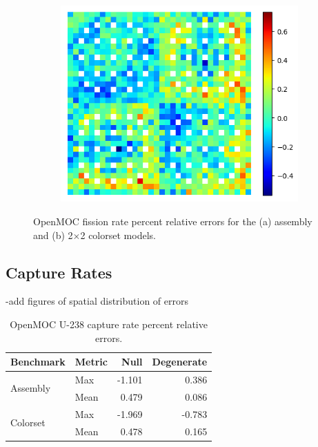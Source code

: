 \begin{figure}[h!]
\begin{subfigure}{0.45\textwidth}
  \includegraphics[width=\linewidth]{figures/reflector/fiss-degenerate-errors}
  \caption{}
  \label{fig:reflector-fiss-degen-error}
\end{subfigure}
\caption{OpenMOC fission rate percent relative errors for the (a) assembly and (b) 2$\times$2 colorset models.}
\label{fig:fiss-errors}
\end{figure}


\subsection{Capture Rates}
\label{subsec:capt-rates}

-add figures of spatial distribution of errors

\begin{table}[h!]
  \centering
  \caption{OpenMOC U-238 capture rate percent relative errors.}
  \label{tab:capt-bias} 
  \begin{tabular}{l l r r}
  \toprule
  \textbf{Benchmark} & \textbf{Metric} & \textbf{Null} & \textbf{Degenerate} \\
  \midrule
  \multirow{2}{*}{Assembly} & Max  & -1.101 &  0.386 \\
                            & Mean &  0.479 &  0.086 \\
  \midrule
  \multirow{2}{*}{Colorset} & Max  & -1.969 & -0.783 \\
                            & Mean &  0.478 &  0.165 \\
  \bottomrule
\end{tabular}
\end{table}

